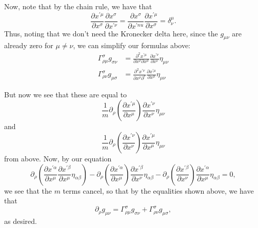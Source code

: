 \documentclass[12pt]{article}
\theoremstyle{definition}
\theoremstyle{remark}
\begin{document}
Now, note that by the chain rule, we have that 
\[
\frac{ \partial x^{ \prime \mu } }{ \partial x^{ \sigma } } 
\frac{ \partial x^{ \sigma } }{ \partial x^{ \prime \nu } } 
=
\frac{ \partial x^{ \sigma } }{ \partial x^{ \prime nu } } 
\frac{ \partial x^{ \prime \mu } }{ \partial x^{ \sigma } }
=
\delta_{\nu}^{ \mu }.
\]
Thus, noting that we don't need the Kronecker delta here, since the $g_{ \mu \nu }$ are already zero for $\mu \neq \nu$, we can simplify our formulas above:
\begin{align*}
\Gamma_{\rho \mu }^{ \sigma } g_{ \sigma \nu } &= 
\frac{ \partial^2 x^{ \prime \mu } }{ \partial x^{ \rho } \partial x^{ \mu } } 
\frac{ \partial x^{ \prime \nu } }{ \partial x^{ \nu } } \eta_{ \mu \nu } \\
\Gamma_{ \rho \nu }^{ \sigma } g_{ \mu \sigma } 
&= 
\frac{ \partial^2 x^{ \prime \nu } }{ \partial x^{ \rho }  \partial ^{ \nu } } 
\frac{ \partial x^{ \prime \mu } }{ \partial x^{ \mu } }  \eta_{ \mu \nu } 
\end{align*}

But now we see that these are equal to 
\[
\frac{ 1}{m} \partial_{ \rho } \left( \frac{ \partial x^{ \prime \mu } }{ \partial x^{ \mu } } \right) \frac{ \partial x^{ \prime \nu } }{ \partial x^{ \nu } } \eta_{ \mu \nu }
\]
and 
\[
\frac{ 1}{ m} \partial_{ \rho } \left( \frac{ \partial x^{ \prime \nu } }{ \partial x^{ \nu } } \right) \frac{ \partial x^{ \prime \mu } }{ \partial x^{ \mu }  } \eta_{ \mu \nu } 
\]
from above. Now, by our equation 
\[
\partial_{\rho} 
\left( \frac{ \partial x^{ \prime \alpha } }{ \partial x^{ \mu } } 
\frac{ \partial x^{ \prime \beta } }{ \partial x^{ \mu } } 
\eta_{ \alpha \beta } \right)
-
\partial_{ \rho }
\left( \frac{ \partial x^{ \prime \alpha } }{ \partial x^{ \mu } } \right) 
\frac{ \partial x^{ \prime \beta } }{ \partial x^{ \nu } } 
\eta_{ \alpha \beta }
-
\partial_{ \rho } 
\left( \frac{ \partial x^{ \prime \beta } }{ \partial x^{ \nu } } \right) 
\frac{ \partial x^{ \prime \alpha } }{ \partial x^{ \mu } } \eta_{\alpha \beta } 
=
0, 
\]
we see that the $m$ terms cancel, so that by the equalities shown above, we have that 
\[
\partial_{ \rho } g_{ \mu \nu } = \Gamma_{ \rho \mu }^{ \sigma } g_{ \sigma \nu } + \Gamma_{ \rho \nu }^{ \sigma } g_{ \mu \sigma } ,
\]
as desired.  \\
\end{document}
